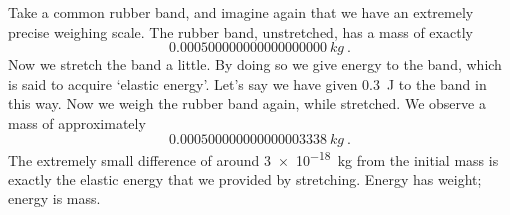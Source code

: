 \documentclass[a4paper,12pt,%
onecolumn,oneside,titlepage,%
british%
]{memoir}
\renewcommand*{\|}[1][]{\nonscript\:#1\vert\nonscript\:\mathopen{}}
\begin{document}
Take a common rubber band, and imagine again that we have an extremely precise weighing scale. The rubber band, unstretched, has a mass of exactly
\begin{equation*}
  \qty{0.000500000000000000000}{kg}\ .
\end{equation*}
Now we stretch the band a little. By doing so we give energy to the band, which is said to acquire \enquote*{elastic energy}. Let's say we have given \qty{0.3}{J} to the band in this way.
Now we weigh the rubber band again, while stretched. We observe a mass of approximately
\begin{equation*}
  \qty{0.000500000000000003338}{kg} \ .
\end{equation*}
The extremely small difference of around \qty{3e-18}{kg} from the initial mass
is exactly the elastic energy that we provided by stretching.
%
%
Energy has weight; energy is mass.

\smallskip
\end{document}

